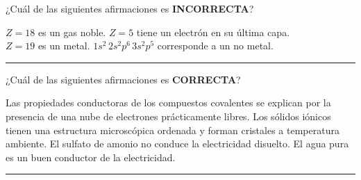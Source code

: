 \documentclass[a4paper,addpoints,14pt]{exam}
\newcommand{\halmos}{\vspace*{-4mm}
	
					\begin{flushright}
						\rule{1mm}{2.5mm} 
					\end{flushright}\vspace*{-4mm}
						
					  }
\renewcommand{\qed}{\halmos}
\begin{document}
	\begin{questions}
	
%			
	\begin{question}[1] ¿Cuál de las siguientes afirmaciones es \textbf{\small{INCORRECTA}}?
	
		\begin{oneparcheckboxes} 
			\choice $Z=18$ es un gas noble.
			\CorrectChoice $Z=5$ tiene un electrón en su última capa.\\
			\choice $Z=19$ es un metal.
			\hspace*{1cm}\choice $1s^2\,2s^2p^6\,3s^2p^5$ corresponde a un no metal.
		\end{oneparcheckboxes}
		\end{question}
		\qed
		\vspace{-1ex}
	
	
	\begin{question}[1] ¿Cuál de las siguientes afirmaciones es \textbf{\small{CORRECTA}}?
		\begin{checkboxes}
			\choice Las propiedades conductoras de los compuestos covalentes se explican por la presencia de una nube de electrones prácticamente libres.
			\CorrectChoice Los sólidos iónicos tienen una estructura microscópica ordenada y forman cristales a temperatura ambiente.
			\choice  El sulfato de amonio no conduce la electricidad disuelto.
		 \choice El agua pura es un buen conductor de la electricidad.
		\end{checkboxes}
	\end{question}
	\qed
	\vspace{-1ex}
	
		


\end{questions}
\end{document}
